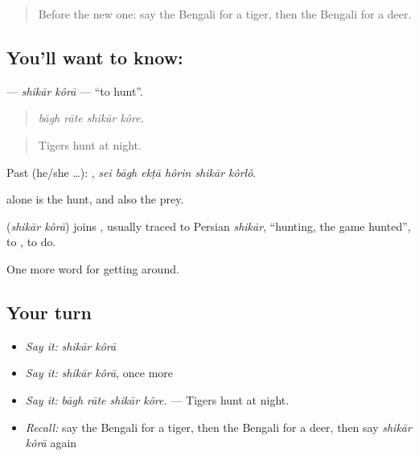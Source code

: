 \label{lesson:BN-C437-shikar-kora}



\begin{quote}
Before the new one: say the Bengali for a tiger, then the Bengali for a deer.
\end{quote}

\subsection*{You'll want to know:  }
\textbf{ } — \emph{shikār kôrā} — \textquotedblleft{}to hunt\textquotedblright{}.

\begin{quote}
   
\end{quote}

\begin{quote}
\emph{bāgh rāte shikār kôre.}
\end{quote}

\begin{quote}
Tigers hunt at night.
\end{quote}

Past (he/she …):      , \emph{sei bāgh ekṭā hôrin shikār kôrlô}.

 alone is the hunt, and also the prey.

\begin{cousinweb}
\textbf{ } (\emph{shikār kôrā}) joins , usually traced to Persian \emph{shikār}, \textquotedblleft{}hunting, the game hunted\textquotedblright{}, to , to do.
\end{cousinweb}

\begin{grammarlens}[title={What you've built}]
One more word for getting around.
\end{grammarlens}

\subsection*{Your turn}
\begin{itemize}
\raggedright
  \item \emph{Say it:} \emph{shikār kôrā}
  \item \emph{Say it:} \emph{shikār kôrā}, once more
  \item \emph{Say it:} \emph{bāgh rāte shikār kôre.} — Tigers hunt at night.
  \item \emph{Recall:} say the Bengali for a tiger, then the Bengali for a deer, then say \emph{shikār kôrā} again
\end{itemize}


